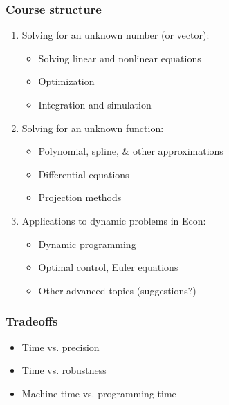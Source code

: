 \documentclass[bigger]{beamer}
\begin{document}
\begin{frame}%

\frametitle{Course structure}

\begin{enumerate}
\item Solving for an unknown number (or vector):

\begin{itemize}
\item Solving linear and nonlinear equations

\item Optimization

\item Integration and simulation
\end{itemize}

\item Solving for an unknown function:

\begin{itemize}
\item Polynomial, spline, \& other approximations

\item Differential equations

\item Projection methods
\end{itemize}

\item Applications to dynamic problems in Econ:

\begin{itemize}
\item Dynamic programming

\item Optimal control, Euler equations

\item Other advanced topics (suggestions?)
\end{itemize}
\end{enumerate}


\end{frame}%

\begin{frame}%

\frametitle{Tradeoffs}

\begin{itemize}
\item Time vs. precision

\item Time vs. robustness

\item Machine time vs. programming time\bigskip
\end{itemize}


\end{frame}%
\end{document}
